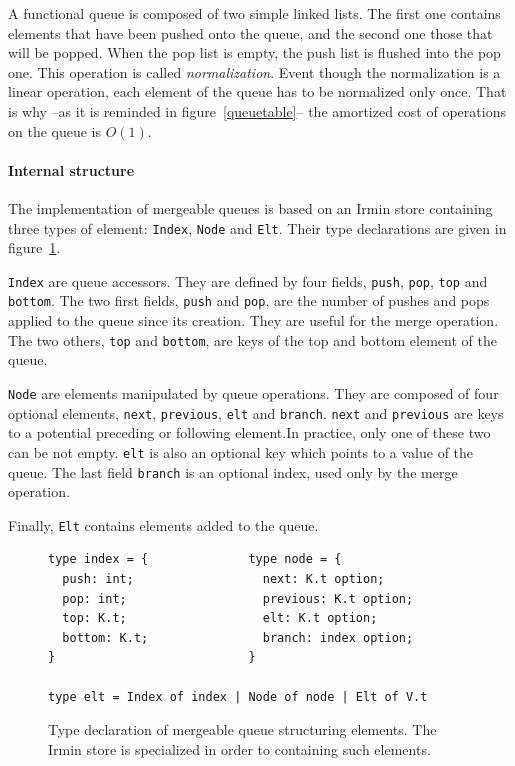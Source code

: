 \documentclass{article}
\newcommand{\irmin}{Irmin\xspace}
\newcommand{\code}[1]{\texttt{#1}}
\begin{document}
A functional queue is composed of two simple linked lists.
The first one contains elements that have been pushed onto the queue, and the second one those that will be popped.
When the pop list is empty, the push list is flushed into the pop one.
This operation is called \emph{normalization}.
Event though the normalization is a linear operation,  each element of the queue has to be normalized only once.
That is why --as it is reminded in figure~\ref{queuetable}-- the amortized cost of operations on the queue is $O(1)$.

\paragraph{Internal structure}
The implementation of mergeable queues is based on an \irmin store containing three types of element: \code{Index}, \code{Node} and \code{Elt}. Their type declarations are given in figure~\ref{queuesig}.

\code{Index} are queue accessors.
They are defined by four fields, \code{push}, \code{pop}, \code{top} and \code{bottom}.
The two first fields, \code{push} and \code{pop}, are the number of pushes and pops applied to the queue since its creation.
They are useful for the merge operation.
The two others, \code{top} and \code{bottom}, are keys of the top and bottom element of the queue.

\code{Node} are elements manipulated by queue operations.
They are composed of four optional elements, \code{next}, \code{previous}, \code{elt} and \code{branch}. \code{next} and \code{previous} are keys to a potential preceding or following element.In practice, only one of these two can be not empty. \code{elt} is also an optional key which points to a value of the queue. The last field \code{branch} is an optional index, used only by the merge operation.

Finally, \code{Elt} contains elements added to the queue.

\begin{figure}[hbt]
%
\begin{lstlisting}
type index = {              type node = {
  push: int;                  next: K.t option;
  pop: int;                   previous: K.t option;
  top: K.t;                   elt: K.t option;
  bottom: K.t;                branch: index option;
}                           }

type elt = Index of index | Node of node | Elt of V.t
\end{lstlisting}
\caption{Type declaration of mergeable queue structuring elements. The \irmin store is specialized in order to containing such elements.}
\label{queuesig}
\end{figure}
\end{document}
